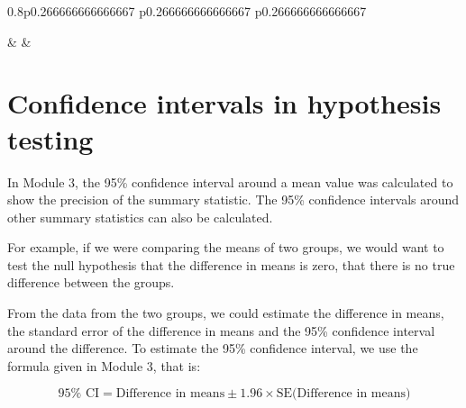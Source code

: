 \documentclass[
]{memoir}
\begin{document}
\begin{table}[ht]
\begin{centerbox}
\begin{threeparttable}
\begin{tabularx}{0.8\textwidth}{p{} p{} p{}}
\hhline{}

 &
 &
 \tabularnewline[-0.5pt]


\end{tabularx}
\end{threeparttable}\par\end{centerbox}

\end{table}
 

\hypertarget{confidence-intervals-in-hypothesis-testing}{%
\section{Confidence intervals in hypothesis testing}\label{confidence-intervals-in-hypothesis-testing}}

In Module 3, the 95\% confidence interval around a mean value was calculated to show the precision of the summary statistic. The 95\% confidence intervals around other summary statistics can also be calculated.

For example, if we were comparing the means of two groups, we would want to test the null hypothesis that the difference in means is zero, that there is no true difference between the groups.

From the data from the two groups, we could estimate the difference in means, the standard error of the difference in means and the 95\% confidence interval around the difference. To estimate the 95\% confidence interval, we use the formula given in Module 3, that is:

\[ 95\% \text{ CI} = \text{Difference in means} \pm 1.96 \times \text{SE}(\text{Difference in means)} \]
\end{document}

